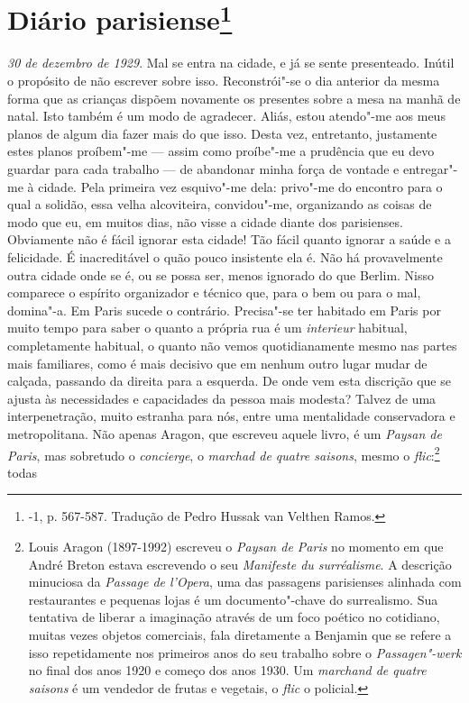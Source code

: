 \chapter{Diário parisiense\footnote[*]{-1, p.
  567-587. Tradução de Pedro Hussak van Velthen Ramos.}}

\emph{30 de dezembro de 1929}. Mal se entra na cidade, e já se sente
presenteado. Inútil o propósito de não escrever sobre isso.
Reconstrói"-se o dia anterior da mesma forma que as crianças dispõem
novamente os presentes sobre a mesa na manhã de natal. Isto também é um
modo de agradecer. Aliás, estou atendo"-me aos meus planos de algum dia
fazer mais do que isso. Desta vez, entretanto, justamente estes planos
proíbem"-me --- assim como proíbe"-me a prudência que eu devo guardar para
cada trabalho --- de abandonar minha força de vontade e entregar"-me à
cidade. Pela primeira vez esquivo"-me dela: privo"-me do encontro para o
qual a solidão, essa velha alcoviteira, convidou"-me, organizando as
coisas de modo que eu, em muitos dias, não visse a cidade diante dos
parisienses. Obviamente não é fácil ignorar esta cidade! Tão fácil quanto
ignorar a saúde e a felicidade. É inacreditável o quão pouco insistente
ela é. Não há provavelmente outra cidade onde se é, ou se possa ser,
menos ignorado do que Berlim. Nisso comparece o espírito organizador e
técnico que, para o bem ou para o mal, domina"-a. Em Paris sucede o
contrário. Precisa"-se ter habitado em Paris por muito tempo para saber o
quanto a própria rua é um \emph{interieur} habitual, completamente
habitual, o quanto não vemos quotidianamente mesmo nas partes mais
familiares, como é mais decisivo que em nenhum outro lugar mudar de
calçada, passando da direita para a esquerda. De onde vem esta discrição
que se ajusta às necessidades e capacidades da pessoa mais modesta?
Talvez de uma interpenetração, muito estranha para nós, entre uma
mentalidade conservadora e metropolitana. Não apenas Aragon, que
escreveu aquele livro, é um \emph{Paysan de Paris}, mas sobretudo o
\emph{concierge}, o \emph{marchad de quatre saisons}, mesmo o
\emph{flic}:\footnote{Louis Aragon (1897-1992) escreveu o
  \emph{Paysan de Paris} no momento em que André Breton estava
  escrevendo o seu \emph{Manifeste du surréalisme}. A descrição
  minuciosa da \emph{Passage de l'Opera}, uma das passagens parisienses
  alinhada com restaurantes e pequenas lojas é um documento"-chave do
  surrealismo. Sua tentativa de liberar a imaginação através de um foco
  poético no cotidiano, muitas vezes objetos comerciais, fala diretamente
  a Benjamin que se refere a isso repetidamente nos primeiros anos do
  seu trabalho sobre o \emph{Passagen"-werk} no final dos anos 1920 e
  começo dos anos 1930. Um \emph{marchand de quatre saisons} é um
  vendedor de frutas e vegetais, o \emph{flic} o policial. \versal{[N. E.]}} todas
